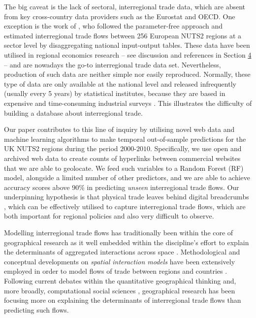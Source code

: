 \documentclass[]{interact}
\theoremstyle{plain}%
\theoremstyle{definition}
\theoremstyle{remark}
\begin{document}
The big caveat is the lack of sectoral, interregional trade data, which
are absent from key cross-country data providers such as the Eurostat
and OECD. One exception is the work of \citet{thissen2013integrated},
who followed the parameter-free \citet{simini2012universal} approach and
estimated interregional trade flows between 256 European NUTS2 regions
at a sector level by disaggregating national input-output tables. These
data have been utilised in regional economics research -- see discussion
and references in Section \protect\hyperlink{sec:4}{4} -- and are
nowadays the go-to interregional trade data set. Nevertheless,
production of such data are neither simple nor easily reproduced.
Normally, these type of data are only available at the national level
and released infrequently (usually every 5 years) by statistical
institutes, because they are based in expensive and time-consuming
industrial surveys \citep{boero2018regional}. This illustrates the
difficulty of building a database about interregional trade.

Our paper contributes to this line of inquiry by utilising novel web
data and machine learning algorithms to make temporal out-of-sample
predictions for the UK NUTS2 regions during the period
\(2000\)-\(2010\). Specifically, we use open and archived web data to
create counts of hyperlinks between commercial websites that we are able
to geolocate. We feed such variables to a Random Forest (RF) model,
alongside a limited number of other predictors, and we are able to
achieve accuracy scores above 90\% in predicting \emph{unseen}
interregional trade flows. Our underpinning hypothesis is that physical
trade leaves behind digital breadcrumbs \citep{rabari_storper2014},
which can be effectively utilised to capture interregional trade flows,
which are both important for regional policies and also very difficult
to observe.

Modelling interregional trade flows has traditionally been within the
core of geographical research as it well embedded within the
discipline's effort to explain the determinants of aggregated
interactions across space \citep[for a recent review
see][]{oshan2020spatial}. Methodological and conceptual developments on
\emph{spatial interaction models} have been extensively employed in
order to model flows of trade between regions
\citep{chun2012modeling, paul2008incorporating} and countries
\citep{de2017testing, de2017competing}. Following current debates within
the quantitative geographical thinking \citep{singleton2021geographic}
and, more broadly, computational social sciences
\citep{lazer2009social}, geographical research has been focusing more on
explaining the determinants of interregional trade flows than predicting
such flows.
\end{document}
